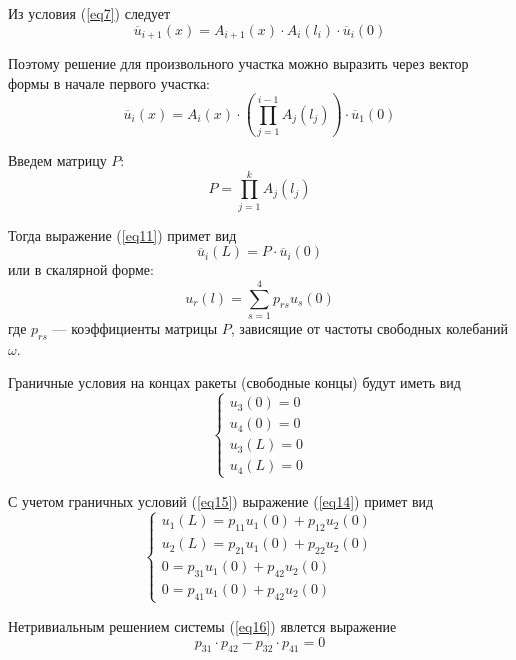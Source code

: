 Из условия (\ref{eq7}) следует
\begin{equation}
    \label{eq10}
    \overline{u}_{i+1}(x) = A_{i+1}(x) \cdot A_i(l_i) \cdot\overline{u}_i(0)
\end{equation}

Поэтому решение для произвольного участка можно выразить через вектор формы в начале первого участка:
\begin{equation}
    \label{eq11}
    \overline{u}_i(x) = A_i(x) \cdot \left( \prod_{j=1}^{i-1} A_j(l_j) \right) \cdot \overline{u}_1(0)
\end{equation}

Введем матрицу $P$:
\begin{equation}
    \label{eq12}
    P = \prod_{j=1}^{k} A_j(l_j)
\end{equation}

Тогда выражение (\ref{eq11}) примет вид
\begin{equation}
    \label{eq13}
    \overline{u}_i(L) = P \cdot \overline{u}_i(0)
\end{equation}
или в скалярной форме:
\begin{equation}
    \label{eq14}
    u_r(l) = \sum_{s=1}^{4} p_{rs} u_s(0)
\end{equation}
где $p_{rs}$ --- коэффициенты матрицы $P$, зависящие от частоты свободных колебаний $\omega$.

Граничные условия на концах ракеты (свободные концы) будут иметь вид
\begin{equation}
    \label{eq15}
    \begin{cases}
        u_3(0) = 0
        \\
        u_4(0) = 0
        \\
        u_3(L) = 0
        \\
        u_4(L) = 0
    \end{cases}
\end{equation}

С учетом граничных условий (\ref{eq15}) выражение (\ref{eq14}) примет вид
\begin{equation}
    \label{eq16}
    \begin{cases}
        u_1(L) = p_{11} u_1(0) + p_{12} u_2(0)
        \\
        u_2(L) = p_{21} u_1(0) + p_{22} u_2(0)
        \\
        0 = p_{31} u_1(0) + p_{42} u_2(0)
        \\
        0 = p_{41} u_1(0) + p_{42} u_2(0)
    \end{cases}
\end{equation}

Нетривиальным решением системы (\ref{eq16}) явлется выражение
\begin{equation}
    \label{eq17}
    p_{31} \cdot p_{42} - p_{32} \cdot p_{41} = 0
\end{equation}